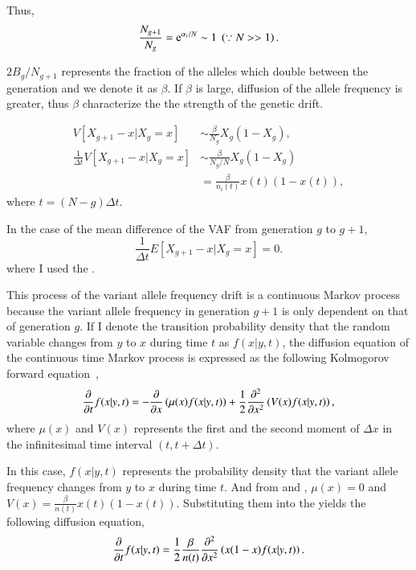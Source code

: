 \documentclass{article}
\begin{document}
Thus,
\begin{equation}
 \frac{N_{g+1}}{N_g} = \mathrm{e}^{\alpha_i / N} \sim 1 \; \left(\because N >> 1\right).
\end{equation}

$2B_g/N_{g+1}$ represents the fraction of the alleles which double between the generation and we denote it as $\beta$.
If $\beta$ is large, diffusion of the allele frequency is greater, thus $\beta$ characterize the the strength of the genetic drift.

\begin{align}
 V[X_{g+1} - x | X_g=x] & \sim \frac{\beta}{N_g} X_g \left(1 - X_g \right),\nonumber\\
 \frac{1}{\varDelta t}V[X_{g+1} - x | X_{g}=x] & \sim \frac{\beta}{N_g/N} X_g \left(1 - X_g \right)\nonumber \\
 & = \frac{\beta}{n_i(t)} x(t) \left(1 - x(t) \right),\label{VAF_diff_variance_inf}
\end{align}
where $t = (N - g) \varDelta t$.

In the case of the mean difference of the VAF from generation $g$ to $g+1$, 
\begin{equation}
 \frac{1}{\varDelta t} E[X_{g+1} - x | X_{g}=x] = 0.\label{VAF_diff_mean_inf}
\end{equation}
where I used the .

This process of the variant allele frequency drift is a continuous Markov process because the variant allele frequency in generation $g+1$ is only dependent on that of generation $g$.
If I denote the transition probability density that the random variable changes from $y$ to $x$ during time $t$ as $f(x|y,t)$, the diffusion equation of the continuous time Markov process is expressed as the following Kolmogorov forward equation~\cite{kolmogoroff1931analytischen,kimura1964diffusion},
\begin{equation}
 \frac{\partial {}}{\partial {t}} f(x|y,t) = - \frac{\partial {}}{\partial {x}} \left( \mu(x) f(x|y,t) \right) + \frac{1}{2} \frac{\partial^2}{\partial x^2} \left( V(x) f(x|y,t) \right),\label{kolmogorov_forward_eq}
\end{equation}
where $\mu(x)$ and $V(x)$ represents the first and the second moment of $\varDelta x$ in the infinitesimal time interval $(t,t + \varDelta t)$.

In this case, $f(x|y,t)$ represents the probability density that the variant allele frequency changes from $y$ to $x$ during time $t$.
And from  and , $\mu(x) = 0$ and $V(x) = \frac{\beta}{n(t)} x(t) \left(1 - x(t) \right)$.
Substituting them into the  yields the following diffusion equation,
\begin{equation}
 \frac{\partial {}}{\partial {t}} f(x|y,t) = \frac{1}{2} \frac{\beta}{n(t)} \frac{\partial^2}{\partial x^2} \left( x(1-x) f(x|y,t) \right).\label{WF_dissusion}
\end{equation}
\end{document}
